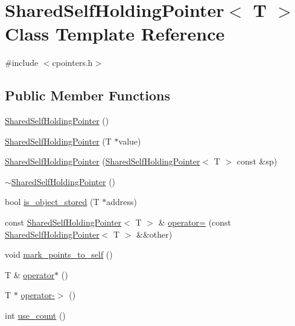 \hypertarget{classSharedSelfHoldingPointer}{}\section{Shared\+Self\+Holding\+Pointer$<$ T $>$ Class Template Reference}
\label{classSharedSelfHoldingPointer}


{\ttfamily \#include $<$cpointers.\+h$>$}

\subsection*{Public Member Functions}
\begin{DoxyCompactItemize}
\item 
\hyperlink{classSharedSelfHoldingPointer_a4a81e4be5cf4c074d92122b05ef1a7bf}{Shared\+Self\+Holding\+Pointer} ()
\item 
\hyperlink{classSharedSelfHoldingPointer_af7081c7427461f6a84765a5c6373f2d4}{Shared\+Self\+Holding\+Pointer} (T $\ast$value)
\item 
\hyperlink{classSharedSelfHoldingPointer_a95944d9c7dc5d9b8c6a7efd481ac4906}{Shared\+Self\+Holding\+Pointer} (\hyperlink{classSharedSelfHoldingPointer}{Shared\+Self\+Holding\+Pointer}$<$ T $>$ const \&sp)
\item 
\hyperlink{classSharedSelfHoldingPointer_a1f3b14c8c9f032a20304c1d053163dec}{$\sim$\+Shared\+Self\+Holding\+Pointer} ()
\item 
bool \hyperlink{classSharedSelfHoldingPointer_a92698bf43ff7ad98da2c3d8f451c9baf}{is\+\_\+object\+\_\+stored} (T $\ast$address)
\item 
const \hyperlink{classSharedSelfHoldingPointer}{Shared\+Self\+Holding\+Pointer}$<$ T $>$ \& \hyperlink{classSharedSelfHoldingPointer_afc954c0df268b48304658e3cc078a4d8}{operator=} (const \hyperlink{classSharedSelfHoldingPointer}{Shared\+Self\+Holding\+Pointer}$<$ T $>$ \&\&other)
\item 
void \hyperlink{classSharedSelfHoldingPointer_aaa0d7a61277cb3e6040d010f0f805925}{mark\+\_\+points\+\_\+to\+\_\+self} ()
\item 
T \& \hyperlink{classSharedSelfHoldingPointer_a3080f870971ee581429079cd998b466f}{operator$\ast$} ()
\item 
T $\ast$ \hyperlink{classSharedSelfHoldingPointer_a510f0f53ca3c52af77422b12d6e3ffb6}{operator-\/$>$} ()
\item 
int \hyperlink{classSharedSelfHoldingPointer_a09f8385ee224f32cc86261af7a9643b8}{use\+\_\+count} ()
\end{DoxyCompactItemize}


